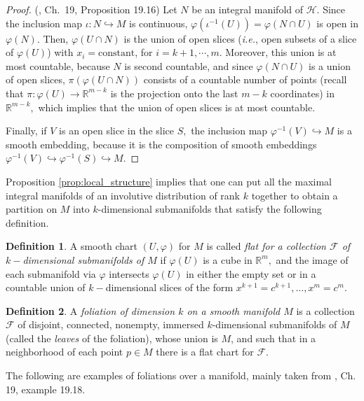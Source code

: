 \documentclass[12pt, letterpaper, reqno]{amsart}
\theoremstyle{definition}
\newtheorem{df}{Definition}
\theoremstyle{plain}
\theoremstyle{remark}
\begin{document}
\begin{proof}(\cite{lee2003introduction}, Ch.~19, Proposition 19.16)
	Let $ N $ be an integral manifold of $ \mathcal{H}. $ Since the inclusion map $ \iota: N \hookrightarrow M $ is continuous, $ \varphi( \iota^{-1}(U))=\varphi(N\cap U) $  is open in $ \varphi(N) $. Then, $ \varphi(U\cap N) $ is the union of open slices (\textit{i.e.}, open subsets of a slice of $ \varphi(U)$) with $ x_i=\text{constant} $, for $ i=k+1,\cdots,m.$ Moreover, this union is at most countable, because $ N $ is second countable, and since $ \varphi(N\cap U) $ is a union of open slices, $ \pi(\varphi(U\cap N)) $ consists of a countable number of points (recall that $ \pi: \varphi(U) \rightarrow \mathbb{R}^{m-k} $ is the projection onto the last $ m-k $ coordinates) in $ \mathbb{R}^{m-k}, $ which implies that the union of open slices is at most countable.  

	Finally, if $ V $ is an open slice in the slice $ S, $ the inclusion map $ \varphi^{-1}(V) \hookrightarrow M $ is a smooth embedding, because it is the composition of smooth embeddings $ \varphi^{-1}(V)\hookrightarrow \varphi^{-1}(S) \hookrightarrow M.$ 
\end{proof}

Proposition \ref{prop:local_structure} implies that one can put all the maximal integral manifolds of an involutive distribution of rank $ k $  together to obtain a partition on $ M $ into $ k $-dimensional submanifolds that satisfy the following definition.
\begin{df}
	A smooth chart $ (U,\varphi) $ for $ M $ is called \textit{flat for a collection $ \mathcal{F} $ of $ k- $dimensional submanifolds of $ M $} if $ \varphi(U) $ is a cube in $ \mathbb{R}^m, $ and the image of each submanifold via $ \varphi $ intersects $ \varphi(U) $ in either the empty set or in a countable union of $ k- $dimensional slices of the form $ x^{k+1}=c^{k+1},\dots,x^m=c^m. $   
\end{df}

\begin{df}
	A \textit{foliation of dimension $ k $ on a smooth manifold $ M $} is a collection $ \mathcal{F} $ of disjoint, connected, nonempty, immersed $ k $-dimensional submanifolds of $ M $ (called the \textit{leaves} of the foliation), whose union is $ M $, and such that in a neighborhood of each point $ p\in M $ there is a flat chart for $ \mathcal{F}. $  
\end{df}

The following are examples of foliations over a manifold, mainly taken from \cite{lee2003introduction}, Ch. 19, example 19.18.
\end{document}
